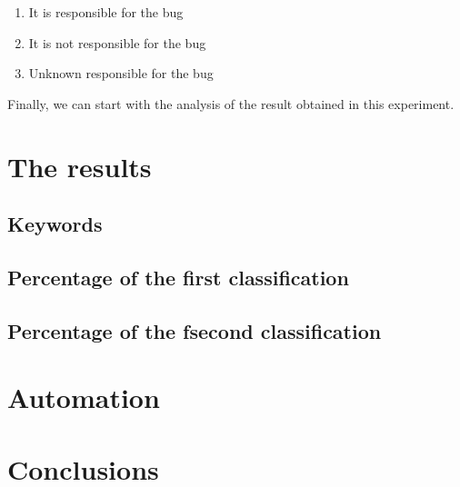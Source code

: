 \documentclass[a4paper]{article}
\begin{document}
\begin{itemize}
\begin{enumerate}
    \item It is responsible for the bug   
     \item It is not responsible for the bug
    \item Unknown responsible for the bug
\end{enumerate}

Finally, we can start with the analysis of the result obtained in this experiment. 

\end{itemize}

\section{The results}
\subsection {Keywords}

\subsection {Percentage of the first classification}
\subsection {Percentage of the fsecond classification}

\section{Automation}
\section{Conclusions}
\end{document}
